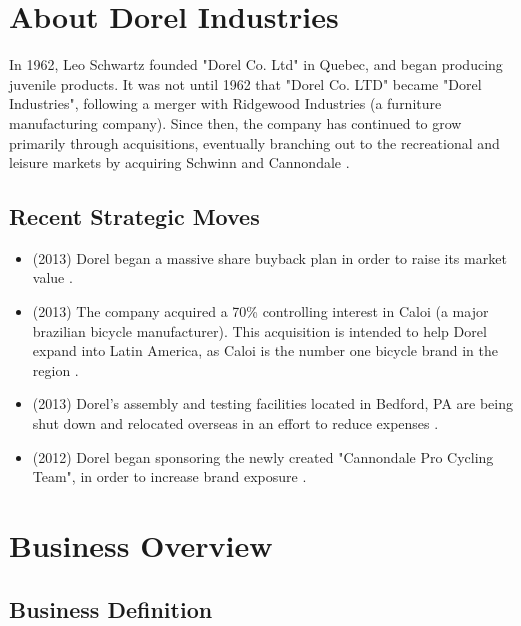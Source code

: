 \chapter{About Dorel Industries}
\label{chp:about}

In 1962, Leo Schwartz founded "Dorel Co. Ltd" in Quebec, and began producing juvenile products.  It was not until 1962 that "Dorel Co. LTD" became "Dorel Industries", following a merger with Ridgewood Industries (a furniture manufacturing company).  Since then, the company has continued to grow primarily through acquisitions, eventually branching out to the recreational and leisure markets by acquiring Schwinn and Cannondale \cite{DorelIndustries2013}.


\section{Recent Strategic Moves}
\begin{itemize}
  \item (2013) Dorel began a massive share buyback plan in order to raise its market value \cite{Smith2014}.
  \item (2013) The company acquired a 70\% controlling interest in Caloi (a major brazilian bicycle manufacturer).  This acquisition is intended to help Dorel expand into Latin America, as Caloi is the number one bicycle brand in the region \cite{DorelIndustries2013}.
  \item (2013) Dorel’s assembly and testing facilities located in Bedford, PA are being shut down and relocated overseas in an effort to reduce expenses \cite{VoiceofAmerica2009}.
  \item (2012) Dorel began sponsoring the newly created "Cannondale Pro Cycling Team", in order to increase brand exposure \cite{DorelIndustries2012} .
\end{itemize}


\chapter{Business Overview}
\label{chp:overview}


\section{Business Definition}

